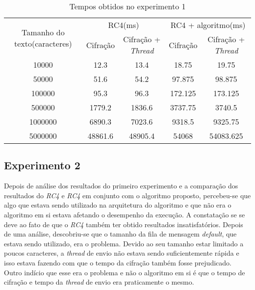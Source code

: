 \begin{table}[h]
\centering
\begin{tabular}{|c|c|c|c|c|}
\hline
\multirow{2}{3cm}{Tamanho do texto(caracteres)} & \multicolumn{2}{c|}{RC4(ms)}     & \multicolumn{2}{c|}{RC4 + algoritmo(ms)} \\ \cline{2-5} 
                                     & Cifração & Cifração + \textit{Thread} & Cifração     & Cifração + \textit{Thread}     \\ \hline
10000                                & 12.3     & 13.4              & 18.75        & 19.75                 \\ \hline
50000                                & 51.6     & 54.2              & 97.875       & 98.875                \\ \hline
100000                               & 95.3     & 96.3              & 172.125      & 173.125               \\ \hline
500000                               & 1779.2   & 1836.6            & 3737.75      & 3740.5                \\ \hline
1000000                              & 6890.3   & 7023.6            & 9318.5       & 9325.75               \\ \hline
5000000                              & 48861.6  & 48905.4           & 54068        & 54083.625             \\ \hline
\end{tabular}
\caption{Tempos obtidos no experimento 1}
\label{results-experiment-1}
\end{table}

\subsection{Experimento 2}

Depois de análise dos resultados do primeiro experimento e a comparação dos resultados do \textit{RC4} e \textit{RC4} em conjunto com o algoritmo proposto, percebeu-se que algo que estava sendo utilizado na arquitetura do algoritmo e que não era o algoritmo em si estava afetando o desempenho da execução. A constatação se  se deve ao fato de que o \textit{RC4} também ter obtido resultados insatisfatórios. Depois de uma análise, descobriu-se que o tamanho da fila de mensagem \textit{default}, que estava sendo utilizado, era o problema. Devido ao seu tamanho estar limitado a poucos caracteres, a \textit{thread} de envio não estava sendo suficientemente rápida  e isso estava fazendo com que o tempo da cifração também fosse prejudicado. Outro indício que esse era o problema e não o algoritmo em si é que o tempo de cifração e tempo da \textit{thread} de envio era praticamente o mesmo. 

